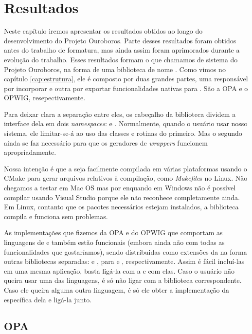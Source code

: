 \chapter{Resultados}
\label{sec:resultados}

Neste capítulo iremos apresentar os resultados obtidos ao longo do
desenvolvimento do Projeto Ouroboros. Parte desses resultados foram
obtidos antes do trabalho de formatura, mas ainda assim foram aprimorados
durante a evolução do trabalho. Esses resultados formam o que
chamamos de sistema do Projeto Ouroboros, na forma de uma biblioteca \CXX{}
de nome . Como vimos no capítulo \ref{cap:estrutura},
ele é composto por duas grandes partes, uma responsável por incorporar
 e outra por exportar funcionalidades nativas para .
São a OPA e o OPWIG, resepectivamente.

Para deixar clara a separação entre eles, os cabeçalho da biblioteca
dividem a interface dela em dois \textit{namespaces}:  e .
Normalmente, quando o usuário usar nosso sistema, ele limitar-se-á ao uso
das classes e rotinas do primeiro. Mas o segundo ainda se faz necessário
para que os geradores de \textit{wrappers} funcionem apropriadamente.

Nossa intenção é que a  seja facilmente compilada em várias plataformas
usando o CMake para gerar arquivos relativos à compilação, como \textit{Makefile}s
no Linux. Não chegamos a testar em Mac OS mas por enquando em Windows não é
possível compilar usando Visual Studio porque ele não reconhece  completamente
ainda. Em Linux, contanto que os pacotes necessários estejam instalados, a biblioteca
compila e funciona sem problemas.

As implementações que fizemos da OPA e do OPWIG que comportam as linguagens de
\script{}  e  também estão funcionais (embora ainda não
com todas as funcionalidades que gostaríamos), sendo distríbuidas como extensões
da  na forma outras bibliotecas separadas: 
e , para  e , respectivamente.
Assim é fácil incluí-las em uma mesma aplicação, basta ligá-la com a
 e com elas. Caso o usuário não queira usar uma das linguagens,
é só não ligar com a biblioteca correspondente. Caso ele queira alguma outra
linguagem, é só ele obter a implementação da  específica dela
e ligá-la junto.

\section{OPA}
\label{cap:resultados:opa}

